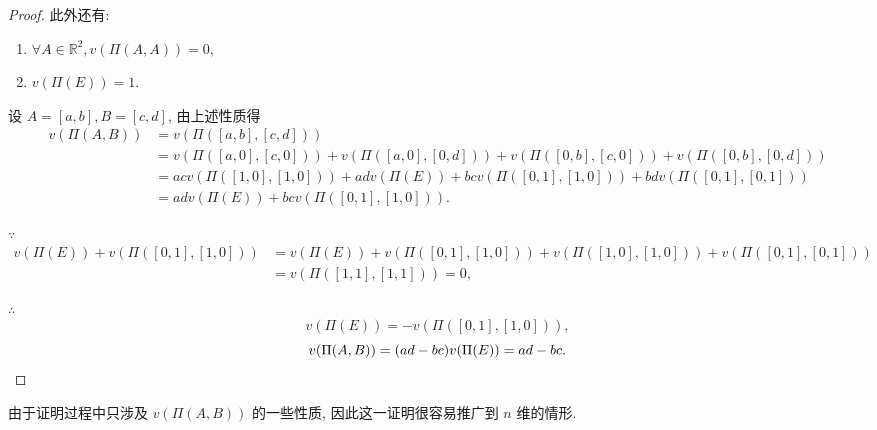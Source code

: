 \documentclass{ctexart}
\begin{document}
\begin{proof}
    此外还有:
    \begin{enumerate}
        \item $\forall A\in\mathbb{R}^2,v(\Pi(A,A))=0$,
        \item $v(\Pi(E))=1$.
    \end{enumerate}

    设 $A=[a,b],B=[c,d]$, 由上述性质得
    \begin{align*}
        v(\Pi(A,B)) & =v(\Pi([a,b],[c,d])) \\
        & =v(\Pi([a,0],[c,0]))+v(\Pi([a,0],[0,d]))+v(\Pi([0,b],[c,0]))+v(\Pi([0,b],[0,d])) \\
        & =acv(\Pi([1,0],[1,0]))+adv(\Pi(E))+bcv(\Pi([0,1],[1,0]))+bdv(\Pi([0,1],[0,1])) \\
        & =adv(\Pi(E))+bcv(\Pi([0,1],[1,0])).
    \end{align*}

    $\because$
    \begin{align*}
        v(\Pi(E))+v(\Pi([0,1],[1,0])) & =v(\Pi(E))+v(\Pi([0,1],[1,0]))+v(\Pi([1,0],[1,0]))+v(\Pi([0,1],[0,1])) \\
        & =v(\Pi([1,1],[1,1]))=0,
    \end{align*}

    $\therefore$
    \[v(\Pi(E))=-v(\Pi([0,1],[1,0])),\]
    \[v(\Pi(A,B))=(ad-bc)v(\Pi(E))=ad-bc.\qedhere\]
\end{proof}

由于证明过程中只涉及 $v(\Pi(A,B))$ 的一些性质, 因此这一证明很容易推广到 $n$ 维的情形.
\end{document}
